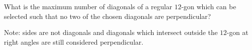 What is the maximum number of diagonals of a regular $12$-gon which can be selected such that no two of the chosen diagonals are perpendicular?

Note: sides are not diagonals and diagonals which intersect outside the $12$-gon at right angles are still considered perpendicular.
